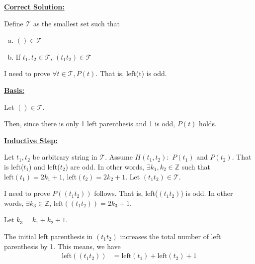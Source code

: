 \documentclass[12pt]{article}
\begin{document}
\bigskip

\begin{mdframed}
    \underline{\textbf{Correct Solution:}}

    \bigskip

    Define $\mathcal{T}$ as the smallest set such that

    \begin{enumerate}[a.]
        \item $() \in \mathcal{T}$
        \item If $t_1,t_2 \in \mathcal{T}$, $(t_1t_2) \in \mathcal{T}$
    \end{enumerate}

    \bigskip

    I need to prove $\forall t \in \mathcal{T}, P(t)$. That is,
    left(t) is odd.

    \bigskip

    \underline{\textbf{Basis:}}

    \bigskip

    Let $() \in \mathcal{T}$.

    \bigskip

    Then, since there is only 1 left parenthesis and 1 is odd,
    $P(t)$ holds.

    \bigskip

    \underline{\textbf{Inductive Step:}}

    \bigskip

    Let $t_1,t_2$ be arbitrary string in $\mathcal{T}$. Assume
    $H(t_1,t_2):$ $P(t_1)$ and $P(t_2)$. That is left($t_1$) and left($t_2$)
    are odd. \color{red}In other words, $\exists k_1,k_2 \in \mathbb{Z}$ such that
    $\text{left}(t_1) = 2k_1 + 1$, $\text{left}(t_2) = 2k_2 + 1$\color{black}.
    Let $(t_1t_2) \in \mathcal{T}$.

    \bigskip

    I need to prove $P((t_1t_2))$ follows. That is, left($(t_1t_2)$) is odd.
    \color{red}In other words, $\exists k_3 \in \mathbb{Z}$, $\text{left}((t_1t_2)) = 2k_3 + 1$.

    \bigskip

    Let $k_3 = k_1+k_2+1$.\color{black}

    \bigskip

    The initial left parenthesis in $(t_1t_2)$ increases the total number of left
    parenthesis by 1. This means, we have
    \setcounter{equation}{0}
    \begin{align}
        \text{left}((t_1t_2)) &= \text{left}(t_1) + \text{left}(t_2) + 1
    \end{align}


\end{mdframed}
\end{document}
